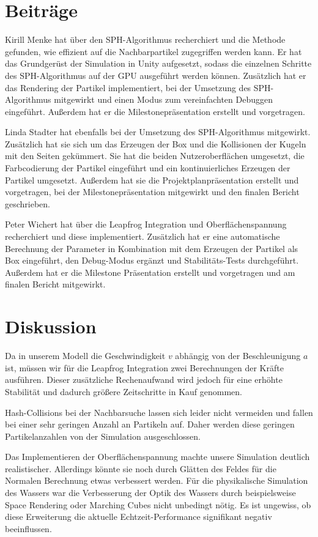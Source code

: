 \documentclass[a4paper]{paper}
\begin{document}
\section{Beiträge}
Kirill Menke hat über den SPH-Algorithmus recherchiert und die Methode gefunden, wie 
effizient auf die Nachbarpartikel zugegriffen werden kann. Er hat das Grundgerüst der Simulation in Unity aufgesetzt, sodass die einzelnen Schritte des SPH-Algorithmus auf der GPU ausgeführt werden können. Zusätzlich hat er das Rendering der Partikel implementiert, bei der Umsetzung des SPH-Algorithmus mitgewirkt und einen Modus zum vereinfachten Debuggen eingeführt. Außerdem hat er die Milestonepräsentation erstellt und vorgetragen. 

Linda Stadter hat ebenfalls bei der Umsetzung des SPH-Algorithmus mitgewirkt. Zusätzlich hat sie sich um das Erzeugen der Box und die Kollisionen der Kugeln mit den Seiten gekümmert. Sie hat die beiden Nutzeroberflächen umgesetzt, die Farbcodierung der Partikel eingeführt und ein kontinuierliches Erzeugen der Partikel umgesetzt. Außerdem hat sie die Projektplanpräsentation erstellt und vorgetragen, bei der Milestonepräsentation mitgewirkt und den finalen Bericht geschrieben.

Peter Wichert hat über die Leapfrog Integration und Oberflächenspannung recherchiert und diese implementiert. Zusätzlich hat er eine automatische Berechnung der Parameter in Kombination mit dem Erzeugen der Partikel als Box eingeführt, den Debug-Modus ergänzt und Stabilitäts-Tests durchgeführt. Außerdem hat er die Milestone Präsentation erstellt und vorgetragen und am finalen Bericht mitgewirkt.



\section{Diskussion}
Da in unserem Modell die Geschwindigkeit $v$ abhängig von der Beschleunigung $a$ ist, müssen wir für die Leapfrog Integration zwei Berechnungen der Kräfte ausführen. Dieser zusätzliche Rechenaufwand wird jedoch für eine erhöhte Stabilität und dadurch größere Zeitschritte in Kauf genommen. 


Hash-Collisions bei der Nachbarsuche lassen sich leider nicht vermeiden und fallen bei einer sehr geringen Anzahl an Partikeln auf. Daher werden diese geringen Partikelanzahlen von der Simulation ausgeschlossen. 

Das Implementieren der Oberflächenspannung machte unsere Simulation deutlich realistischer.
Allerdings könnte sie noch durch Glätten des Feldes für die Normalen Berechnung etwas verbessert werden.
Für die physikalische Simulation des Wassers war die Verbesserung der Optik des Wassers durch beispielsweise Space Rendering oder Marching Cubes nicht unbedingt nötig. Es ist ungewiss, ob diese Erweiterung die aktuelle Echtzeit-Performance signifikant negativ beeinflussen.
\end{document}

